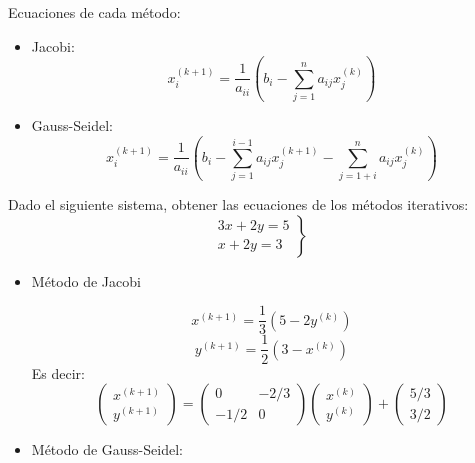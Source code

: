 Ecuaciones de cada método:
\begin{itemize}
    \item Jacobi:
          $$x_i^{(k+1)} = \dfrac{1}{a_{ii}} \left(b_i - \sum_{j=1}^n a_{ij}x_j^{(k)}\right)$$
    \item Gauss-Seidel:
          $$x_i^{(k+1)} = \dfrac{1}{a_{ii}}\left( b_i - \sum_{j=1}^{i-1}a_{ij}x_j^{(k+1)} -
              \sum_{j=1+i}^n a_{ij}x_j^{(k)} \right)$$
\end{itemize}

\begin{ejemplo}
Dado el siguiente sistema, obtener las ecuaciones de los métodos iterativos:
$$
    \left.\begin{array}{r}
        3x+2y=5 \\
        x+2y=3
    \end{array}\right\}
$$

\begin{itemize}
    \item Método de Jacobi

    $$x^{(k+1)}=\dfrac{1}{3}(5-2y^{(k)})$$
    $$y^{(k+1)}=\dfrac{1}{2}(3-x^{(k)})$$
    Es decir:
    $$
        \left(\begin{array}{c}
                x^{(k+1)} \\
                y^{(k+1)}
            \end{array}\right) =
        \left(\begin{array}{cc}
                0    & -2/3 \\
                -1/2 & 0
            \end{array}\right)
        \left(\begin{array}{c}
                x^{(k)} \\
                y^{(k)}
            \end{array}\right) +
        \left(\begin{array}{c}
                5/3 \\
                3/2
            \end{array}\right)
    $$

    \item Método de Gauss-Seidel:
    

\end{itemize}
\end{ejemplo}
